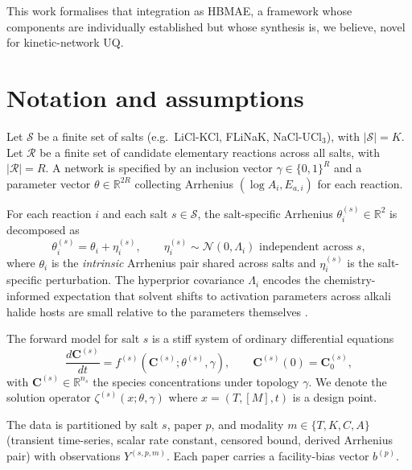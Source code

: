 \documentclass[11pt]{article}
\theoremstyle{definition}
\theoremstyle{remark}
\newcommand{\R}{\mathbb{R}}
\newcommand{\HBMAE}{HBMAE\xspace}
\begin{document}
This work formalises that integration as \HBMAE, a framework whose components are
individually established but whose synthesis is, we believe, novel for kinetic-network UQ.

\section{Notation and assumptions}\label{sec:notation}

Let $\mathcal S$ be a finite set of salts (e.g.\ LiCl-KCl, FLiNaK, NaCl-UCl$_3$), with
$|\mathcal S|=K$. Let $\mathcal R$ be a finite set of candidate elementary reactions across
all salts, with $|\mathcal R|=R$. A network is specified by an inclusion vector
$\gamma\in\{0,1\}^R$ and a parameter vector $\theta\in\R^{2R}$ collecting Arrhenius
$(\log A_i,E_{a,i})$ for each reaction.

For each reaction $i$ and each salt $s\in\mathcal S$, the salt-specific Arrhenius
$\theta_i^{(s)}\in\R^2$ is decomposed as
\begin{equation}\label{eq:hierarchy}
  \theta_i^{(s)} = \theta_i + \eta_i^{(s)},\qquad
  \eta_i^{(s)} \sim \mathcal N(0,\Lambda_i) \text{ independent across } s,
\end{equation}
where $\theta_i$ is the \emph{intrinsic} Arrhenius pair shared across salts and
$\eta_i^{(s)}$ is the salt-specific perturbation. The hyperprior covariance $\Lambda_i$
encodes the chemistry-informed expectation that solvent shifts to activation parameters
across alkali halide hosts are small relative to the parameters themselves \citep{Marcus1965}.

The forward model for salt $s$ is a stiff system of ordinary differential equations
\begin{equation}\label{eq:ode}
  \frac{d\mathbf{C}^{(s)}}{dt} = f^{(s)}(\mathbf{C}^{(s)};\theta^{(s)},\gamma),\qquad
  \mathbf{C}^{(s)}(0)=\mathbf{C}^{(s)}_0,
\end{equation}
with $\mathbf{C}^{(s)}\in\R^{n_s}$ the species concentrations under topology $\gamma$.
We denote the solution operator $\zeta^{(s)}(x;\theta,\gamma)$ where $x=(T,[M],t)$ is a
design point.

The data is partitioned by salt $s$, paper $p$, and modality $m\in\{T,K,C,A\}$
(transient time-series, scalar rate constant, censored bound, derived Arrhenius pair)
with observations $Y^{(s,p,m)}$. Each paper carries a facility-bias vector $b^{(p)}$.
\end{document}
